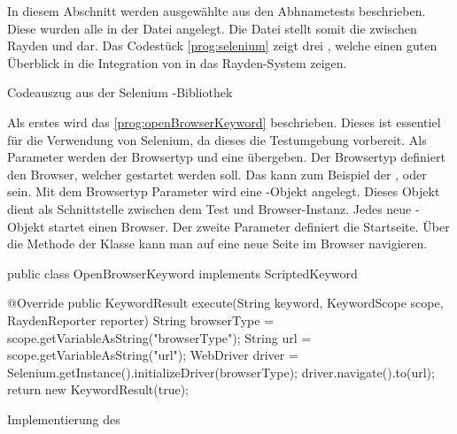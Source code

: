 In diesem Abschnitt werden ausgewählte  aus den Abhnametests beschrieben. Diese  wurden alle in der Datei  angelegt. Die Datei  stellt somit die  zwischen Rayden und  dar. Das Codestück \ref{prog:selenium} zeigt drei , welche einen guten Überblick in die Integration von  in das Rayden-System zeigen. 

\begin{program}

\caption{Codeauszug aus der Selenium -Bibliothek}
\label{prog:selenium}
\end{program}

\SuperPar
Als erstes wird das  \ref{prog:openBrowserKeyword} beschrieben. Dieses  ist essentiel für die Verwendung von Selenium, da dieses  die Testumgebung vorbereit. Als Parameter werden der Browsertyp und eine  übergeben. Der Browsertyp definiert den Browser, welcher gestartet werden soll. Das kann zum Beispiel der ,  oder  sein. Mit dem Browsertyp Parameter wird eine -Objekt angelegt. Dieses Objekt dient als Schnittstelle zwischen dem Test und Browser-Instanz. Jedes neue -Objekt startet einen Browser. Der zweite Parameter  definiert die Startseite. Über die Methode  der Klasse  kann man auf eine neue Seite im Browser navigieren. 

\begin{program}
\begin{JavaCode}
public class OpenBrowserKeyword implements ScriptedKeyword {

	@Override
	public KeywordResult execute(String keyword, KeywordScope scope, RaydenReporter reporter) {
		String browserType = scope.getVariableAsString("browserType");
		String url = scope.getVariableAsString("url");
		WebDriver driver = Selenium.getInstance().initializeDriver(browserType);
		driver.navigate().to(url);
		return new KeywordResult(true);
	}
}
\end{JavaCode}
\caption{Implementierung des }
\label{prog:openBrowserKeyword}
\end{program}

